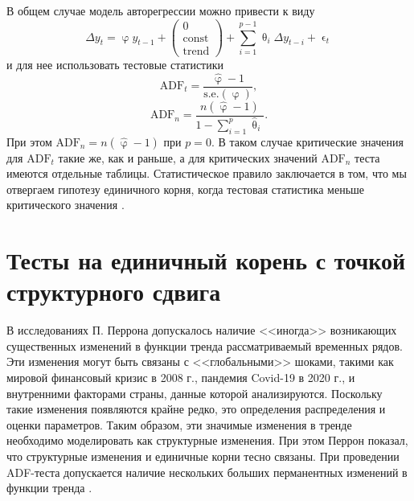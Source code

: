 \documentclass[a4paper, 14pt]{extreport}
\numberwithin{equation}{section}
\renewcommand{\epsilon}{\upvarepsilon}
\renewcommand{\theta}{\uptheta}
\renewcommand{\varphi}{\upvarphi}
\numberwithin{equation}{section}
\begin{document}
	В общем случае модель авторегрессии можно привести к виду
	\begin{equation}
		\Delta y_t=\varphi y_{t-1}+\begin{pmatrix}0\\\text{const}\\\text{trend}\end{pmatrix}+\sum\limits_{i=1}^{p-1}\theta_i\Delta y_{t-i}+\epsilon_t
	\end{equation}
	и для нее использовать тестовые статистики
	\begin{equation}
		\text{ADF}_t=\dfrac{\widehat{\varphi}-1}{\text{s.e.}(\varphi)},
	\end{equation}
	\begin{equation}
		\text{ADF}_n=\dfrac{n(\widehat{\varphi}-1)}{1-\sum_{i=1}^p \widehat{\theta}_i}.
	\end{equation}
	При этом $\text{ADF}_n=n(\widehat{\varphi}-1)$ при $p=0$.
	В таком случае критические значения для $\text{ADF}_t$ такие же, как и раньше, а для критических значений $\text{ADF}_n$ теста имеются отдельные таблицы.
	Статистическое правило заключается в том, что мы отвергаем гипотезу единичного корня, когда тестовая статистика меньше критического значения \cite{11}.
	
	\section{Тесты на единичный корень с точкой структурного сдвига}
	\label{sec:bpur}
	В исследованиях П. Перрона допускалось наличие <<иногда>> возникающих существенных изменений в функции тренда рассматриваемый временных рядов. Эти изменения могут быть связаны с <<глобальными>> шоками, такими как мировой финансовый кризис в 2008 г., пандемия Covid-19 в 2020 г., и внутренними факторами страны, данные которой анализируются. Поскольку такие изменения появляются крайне редко, это определения распределения и оценки параметров. Таким образом, эти значимые изменения в тренде необходимо моделировать как структурные изменения. При этом Перрон показал, что структурные изменения и единичные корни тесно связаны. При проведении ADF-теста допускается наличие нескольких больших перманентных изменений в функции тренда \cite{16}.
	
\end{document}
